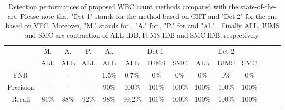 {	\begin{table}[t]
		\centering\tabcolsep=0.2mm
		\begin{tabular}{c cccc ccc ccc ccc}
			\hline
			& \small M.	&	\small A.  	&	\small P.	&	\small Al.	&	\multicolumn{3}{c}{Det 1} & \multicolumn{3}{c}{Det 2}\\
			&  \small ALL   &  \small ALL  & 	\small ALL  & 	\small ALL  &  \small ALL  &	\small IUMS & \small SMC &  \small ALL  &	\small IUMS & \small SMC \\
			\hline
			FNR			& 	- 	& 	- 	&	-	&	1.5\% 	&	0.7\% 	& 	0\%  & 0\% & 0\% & 0\% & 0\% \\
			Precision 	&	-	& 	- &	- &	90\% &	100\%  & 100\% 	& 	100\% & 100\% & 100\% & 100\% \\
			Recall		& 	81\%  &  88\% & 92\% & 	98\% &	99.2\% 	& 	100\%  & 100\% & 100\% & 100\% & 100\% \\
			\hline
		\end{tabular} 
		\caption[WBC count performances.]{Detection performances of proposed WBC count methods compared with the state-of-the-art. Please note that "Det 1" stands for the method based on CHT and "Det 2" for the one based on VFC. Moreover, "M." stands for \cite{Mahmood}, "A." for \cite{Alilou},  "P." for \cite{Put14b} and "Al." \cite{Alomari}. Finally ALL, IUMS and SMC are contraction of ALL-IDB, IUMS-IDB and SMC-IDB, respectively.}
		\label{resulttab}
	\end{table}
	
}

